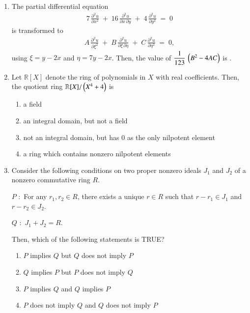 \documentclass[journal,12pt,onecolumn]{IEEEtran}
\theoremstyle{remark}
\begin{document}
\begin{enumerate}
\hfill{}

\item The partial differential equation
\begin{align*}
7\,\frac{\partial^{2}u}{\partial x^{2}}
\;+\;16\,\frac{\partial^{2}u}{\partial x\,\partial y}
\;+\;4\,\frac{\partial^{2}u}{\partial y^{2}}
\;=\;0
\end{align*}
is transformed to
\begin{align*}
A\,\frac{\partial^{2}u}{\partial \xi^{2}}
\;+\;B\,\frac{\partial^{2}u}{\partial \xi\,\partial \eta}
\;+\;C\,\frac{\partial^{2}u}{\partial \eta^{2}}
\;=\;0,
\end{align*}
using $\xi = y - 2x$ and $\eta = 7y - 2x$. Then, the value of $\dfrac{1}{123}\,\left(B^{2}-4AC\right)$ is \underline{\hspace{2cm}}.

\hfill{}
\newpage
\item Let $\mathbb{R}[X]$ denote the ring of polynomials in $X$ with real coefficients. Then, the quotient ring $\mathbb{R}[X]/\left(X^{4} + 4\right)$ is

\hfill{}

\begin{enumerate}
\item a field
\item an integral domain, but not a field
\item not an integral domain, but has $0$ as the only nilpotent element
\item a ring which contains non\textendash zero nilpotent elements
\end{enumerate}

\item Consider the following conditions on two proper non\textendash zero ideals $J_{1}$ and $J_{2}$ of a non\textendash zero commutative ring $R$.

$P$ $\colon$ For any $r_{1}, r_{2} \in R$, there exists a unique $r \in R$ such that $r - r_{1} \in J_{1}$ and $r - r_{2} \in J_{2}$.

$Q$ $\colon$ $J_{1} + J_{2} = R$.

Then, which of the following statements is TRUE?

\hfill{}

\begin{enumerate}
\item $P$ implies $Q$ but $Q$ does not imply $P$
\item $Q$ implies $P$ but $P$ does not imply $Q$
\item $P$ implies $Q$ and $Q$ implies $P$
\item $P$ does not imply $Q$ and $Q$ does not imply $P$
\end{enumerate}


\end{enumerate}
\end{document}
